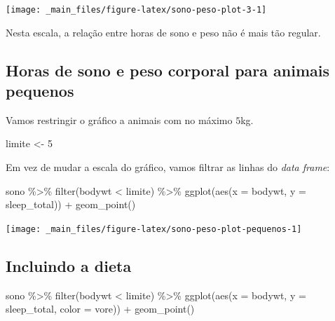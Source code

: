 \documentclass[
  12pt]{report}
\newenvironment{Shaded}{\begin{snugshade}}{\end{snugshade}}
\newcommand{\AttributeTok}[1]{\textcolor[rgb]{0.77,0.63,0.00}{#1}}
\newcommand{\DecValTok}[1]{\textcolor[rgb]{0.00,0.00,0.81}{#1}}
\newcommand{\FunctionTok}[1]{\textcolor[rgb]{0.00,0.00,0.00}{#1}}
\newcommand{\NormalTok}[1]{#1}
\newcommand{\OtherTok}[1]{\textcolor[rgb]{0.56,0.35,0.01}{#1}}
\newcommand{\SpecialCharTok}[1]{\textcolor[rgb]{0.00,0.00,0.00}{#1}}
\begin{document}
\begin{center}\texttt{[image: \_main\_files/figure-latex/sono-peso-plot-3-1]} \end{center}

Nesta escala, a relação entre horas de sono e peso não é mais tão regular.

\hypertarget{horas-de-sono-e-peso-corporal-para-animais-pequenos}{%
\subsection{Horas de sono e peso corporal para animais pequenos}\label{horas-de-sono-e-peso-corporal-para-animais-pequenos}}

Vamos restringir o gráfico a animais com no máximo \(5\)kg.

\begin{Shaded}
\begin{Highlighting}[]
\NormalTok{limite }\OtherTok{\textless{}{-}} \DecValTok{5}
\end{Highlighting}
\end{Shaded}

Em vez de mudar a escala do gráfico, vamos filtrar as linhas do \emph{data frame}:

\begin{Shaded}
\begin{Highlighting}[]
\NormalTok{sono }\SpecialCharTok{\%\textgreater{}\%} 
  \FunctionTok{filter}\NormalTok{(bodywt }\SpecialCharTok{\textless{}}\NormalTok{ limite) }\SpecialCharTok{\%\textgreater{}\%} 
  \FunctionTok{ggplot}\NormalTok{(}\FunctionTok{aes}\NormalTok{(}\AttributeTok{x =}\NormalTok{ bodywt, }\AttributeTok{y =}\NormalTok{ sleep\_total)) }\SpecialCharTok{+}
    \FunctionTok{geom\_point}\NormalTok{()}
\end{Highlighting}
\end{Shaded}

\begin{center}\texttt{[image: \_main\_files/figure-latex/sono-peso-plot-pequenos-1]} \end{center}

\hypertarget{incluindo-a-dieta}{%
\subsection{Incluindo a dieta}\label{incluindo-a-dieta}}

\begin{Shaded}
\begin{Highlighting}[]
\NormalTok{sono }\SpecialCharTok{\%\textgreater{}\%} 
  \FunctionTok{filter}\NormalTok{(bodywt }\SpecialCharTok{\textless{}}\NormalTok{ limite) }\SpecialCharTok{\%\textgreater{}\%} 
  \FunctionTok{ggplot}\NormalTok{(}\FunctionTok{aes}\NormalTok{(}\AttributeTok{x =}\NormalTok{ bodywt, }\AttributeTok{y =}\NormalTok{ sleep\_total, }\AttributeTok{color =}\NormalTok{ vore)) }\SpecialCharTok{+}
    \FunctionTok{geom\_point}\NormalTok{()}
\end{Highlighting}
\end{Shaded}
\end{document}
